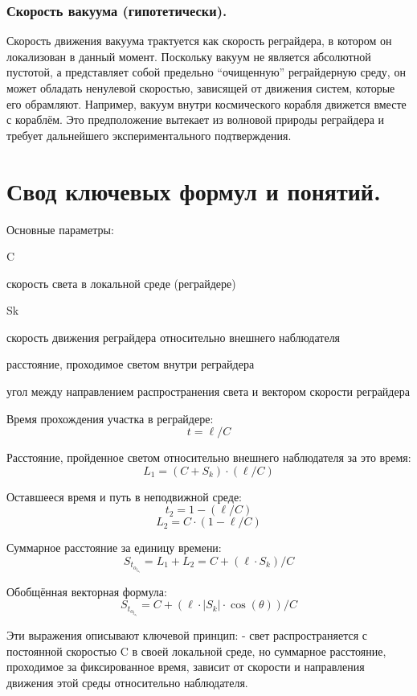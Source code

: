 \documentclass[12pt]{article}
\begin{document}
\subsubsection*{Скорость вакуума (гипотетически).}
Скорость движения вакуума трактуется как скорость реграйдера, в котором он локализован в данный момент. Поскольку вакуум не является абсолютной пустотой, а представляет собой предельно “очищенную” реграйдерную среду, он может обладать ненулевой скоростью, зависящей от движения систем, которые его обрамляют. Например, вакуум внутри космического корабля движется вместе с кораблём. Это предположение вытекает из волновой природы реграйдера и требует дальнейшего экспериментального подтверждения.

\section*{Свод ключевых формул и понятий.}

Основные параметры:
\par
C
\par
скорость света в локальной среде (реграйдере)
\par
Sk
\par
скорость движения реграйдера относительно внешнего наблюдателя
\par
\ell
\par
расстояние, проходимое светом внутри реграйдера
\par
\theta
\par 
угол между направлением распространения света и вектором скорости реграйдера
\par
Время прохождения участка в реграйдере:
\[
t = \ell / C
\]

Расстояние, пройденное светом относительно внешнего наблюдателя за это время:
\[
L_1 = (C + S_k) \cdot (\ell / C)
\]

Оставшееся время и путь в неподвижной среде:
\[
t_2 = 1 - (\ell / C)
\]
\[
L_2 = C \cdot (1 - \ell / C)
\]

Суммарное расстояние за единицу времени:
\[
S_t_o_t_a_l = L_1 + L_2 = C + (\ell \cdot S_k) / C
\]

Обобщённая векторная формула:
\[
S_t_o_t_a_l = C + (\ell \cdot \left|S_k\right| \cdot \cos(\theta)) / C
\]

Эти выражения описывают ключевой принцип:
- свет распространяется с постоянной скоростью C в своей локальной среде, но суммарное расстояние, проходимое за фиксированное время, зависит от скорости и направления движения этой среды относительно наблюдателя.
\end{document}

